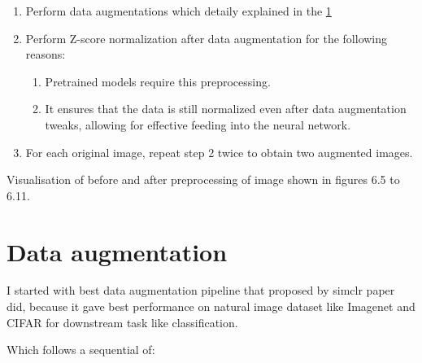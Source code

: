 \begin{enumerate}
  \item Perform data augmentations which detaily explained in the \ref{sec:data augmentation}

  \item Perform Z-score normalization after data augmentation for the following reasons:
  \begin{enumerate}
      \item Pretrained models require this preprocessing.
      \item It ensures that the data is still normalized even after data augmentation tweaks, allowing for effective feeding into the neural network.
  \end{enumerate}

  \item For each original image, repeat step 2 twice to obtain two augmented images.
\end{enumerate}


Visualisation of before and after preprocessing of image shown in figures 6.5 to 6.11.

\section{Data augmentation} \label{sec:data augmentation}

I started with best data augmentation pipeline that proposed by simclr \cite{chen2020simple} paper did,
because it gave best performance on natural image dataset like Imagenet and CIFAR for downstream task like classification. 

Which follows a sequential of:

